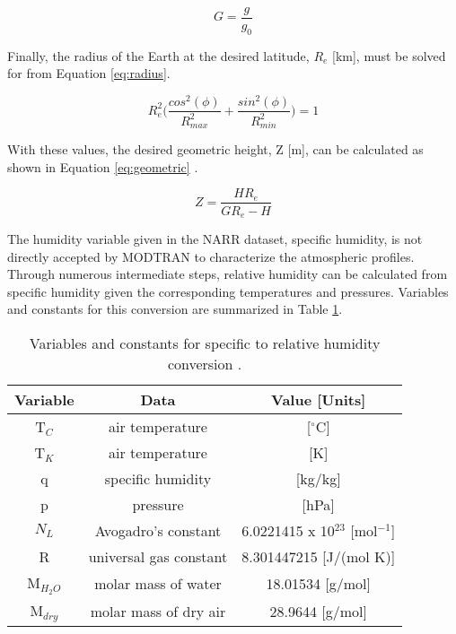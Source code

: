 \documentclass{book}
\begin{document}
\begin{equation}
G = \frac{g}{g_0}
\label{eq:G}
\end{equation}

Finally, the radius of the Earth at the desired latitude, $R_e$ [km], must be solved for from Equation \ref{eq:radius}.

\begin{equation}
R_e^2\bigg(\frac{cos^2(\phi)}{R_{max}^2}+\frac{sin^2(\phi)}{R_{min}^2}\bigg) = 1
\label{eq:radius}
\end{equation}

With these values, the desired geometric height, Z [m], can be calculated as shown in Equation \ref{eq:geometric} \cite{wright_1997}.

\begin{equation}
Z = \frac{HR_e}{GR_e - H}
\label{eq:geometric}
\end{equation}

The humidity variable given in the NARR dataset, specific humidity, is not directly accepted by MODTRAN to characterize the atmospheric profiles.  Through numerous intermediate steps, relative humidity can be calculated from specific humidity given the corresponding temperatures and pressures.  Variables and constants for this conversion are summarized in Table \ref{tab:humidityConversion}.

\begin{table}[H]
\begin{center}
\begin{tabular}{|c | c | c |}
\hline
Variable & Data & Value [Units] \\ \hline
T$_C$ & air temperature & [$^\circ$C] \\ \hline
T$_K$ & air temperature & [K] \\ \hline
q & specific humidity & [kg/kg] \\ \hline
p & pressure & [hPa] \\ \hline
$N_L$ & Avogadro's constant & 6.0221415 x 10$^{23}$ [mol$^{-1}$] \\ \hline
R & universal gas constant & 8.301447215 [J/(mol K)] \\ \hline
M$_{H_2O}$ & molar mass of water & 18.01534 [g/mol] \\ \hline
M$_{dry}$ & molar mass of dry air & 28.9644 [g/mol] \\ \hline
\end{tabular}
\caption{Variables and constants for specific to relative humidity conversion \cite{kruger_2010}.}
\label{tab:humidityConversion}
\end{center}
\end{table}
\end{document}
